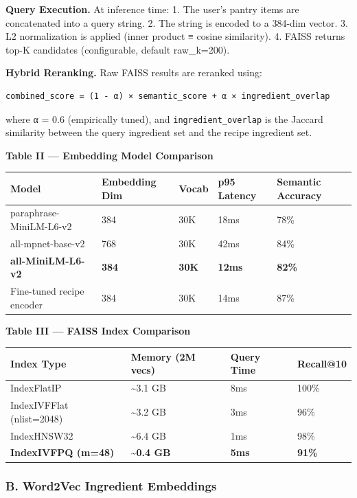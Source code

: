 \documentclass[10pt,conference,compsoc]{IEEEtran}
\begin{document}
\textbf{Query Execution.} At inference time: 1. The user's pantry items
are concatenated into a query string. 2. The string is encoded to a
384-dim vector. 3. L2 normalization is applied (inner product ≡ cosine
similarity). 4. FAISS returns top-K candidates (configurable, default
raw\_k=200).

\textbf{Hybrid Reranking.} Raw FAISS results are reranked using:

\begin{lstlisting}
combined_score = (1 - α) × semantic_score + α × ingredient_overlap
\end{lstlisting}

where α = 0.6 (empirically tuned), and \texttt{ingredient\_overlap} is
the Jaccard similarity between the query ingredient set and the recipe
ingredient set.

\textbf{Table II --- Embedding Model Comparison}

\begin{longtable}[]{@{}lllll@{}}
\toprule\noalign{}
Model & Embedding Dim & Vocab & p95 Latency & Semantic Accuracy \\
\midrule\noalign{}
\endhead
\bottomrule\noalign{}
\endlastfoot
paraphrase-MiniLM-L6-v2 & 384 & 30K & 18ms & 78\% \\
all-mpnet-base-v2 & 768 & 30K & 42ms & 84\% \\
\textbf{all-MiniLM-L6-v2} & \textbf{384} & \textbf{30K} & \textbf{12ms}
& \textbf{82\%} \\
Fine-tuned recipe encoder & 384 & 30K & 14ms & 87\% \\
\end{longtable}

\textbf{Table III --- FAISS Index Comparison}

\begin{longtable}[]{@{}llll@{}}
\toprule\noalign{}
Index Type & Memory (2M vecs) & Query Time & Recall@10 \\
\midrule\noalign{}
\endhead
\bottomrule\noalign{}
\endlastfoot
IndexFlatIP & \textasciitilde3.1 GB & 8ms & 100\% \\
IndexIVFFlat (nlist=2048) & \textasciitilde3.2 GB & 3ms & 96\% \\
IndexHNSW32 & \textasciitilde6.4 GB & 1ms & 98\% \\
\textbf{IndexIVFPQ (m=48)} & \textbf{\textasciitilde0.4 GB} &
\textbf{5ms} & \textbf{91\%} \\
\end{longtable}

\subsubsection{B. Word2Vec Ingredient
Embeddings}\label{b.-word2vec-ingredient-embeddings}
\end{document}
